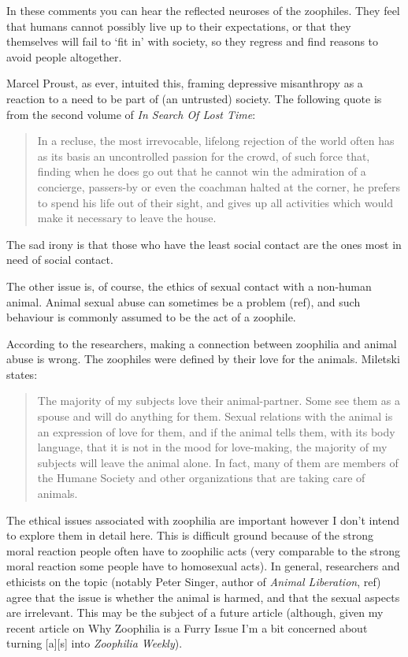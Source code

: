 In these comments you can hear the reflected neuroses of the zoophiles. They feel that humans cannot possibly live up to their expectations, or that they themselves will fail to `fit in' with society, so they regress and find reasons to avoid people altogether.

Marcel Proust, as ever, intuited this, framing depressive misanthropy as a reaction to a need to be part of (an untrusted) society. The following quote is from the second volume of \textit{In Search Of Lost Time}:

\begin{quote}
  In a recluse, the most irrevocable, lifelong rejection of the world often has as its basis an uncontrolled passion for the crowd, of such force that, finding when he does go out that he cannot win the admiration of a concierge, passers-by or even the coachman halted at the corner, he prefers to spend his life out of their sight, and gives up all activities which would make it necessary to leave the house.
\end{quote}

The sad irony is that those who have the least social contact are the ones most in need of social contact.

The other issue is, of course, the ethics of sexual contact with a non-human animal. Animal sexual abuse can sometimes be a problem (ref), and such behaviour is commonly assumed to be the act of a zoophile.

According to the researchers, making a connection between zoophilia and animal abuse is wrong. The zoophiles were defined by their love for the animals. Miletski states:

\begin{quote}
  The majority of my subjects love their animal-partner. Some see them as a spouse and will do anything for them. Sexual relations with the animal is an expression of love for them, and if the animal tells them, with its body language, that it is not in the mood for love-making, the majority of my subjects will leave the animal alone. In fact, many of them are members of the Humane Society and other organizations that are taking care of animals.
\end{quote}

The ethical issues associated with zoophilia are important however I don't intend to explore them in detail here. This is difficult ground because of the strong moral reaction people often have to zoophilic acts (very comparable to the strong moral reaction some people have to homosexual acts). In general, researchers and ethicists on the topic (notably Peter Singer, author of \textit{Animal Liberation}, ref) agree that the issue is whether the animal is harmed, and that the sexual aspects are irrelevant. This may be the subject of a future article (although, given my recent article on Why Zoophilia is a Furry Issue I'm a bit concerned about turning [a][s] into \textit{Zoophilia Weekly}).

